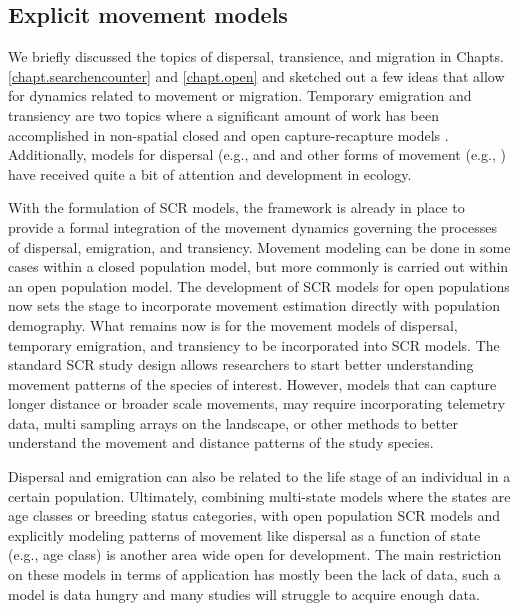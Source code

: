 \subsection{Explicit movement models}



We briefly discussed the topics of dispersal,
transience, and migration in Chapts. \ref{chapt.searchencounter} and \ref{chapt.open} and sketched out
a few ideas that allow for dynamics related to movement or migration.
Temporary emigration and transiency are two topics where
a significant amount of work has been accomplished in non-spatial closed and open capture-recapture
models \citep{kendall_etal:1997, pradel_hines:1997, hines_etal:2003,
clavel_etal:2008, gilroy_etal:2012,chandler_etal:2011}.
Additionally, models for dispersal (e.g., \citet{clobert_etal:2001,
ovaskainen:2004, ovaskainen_etal:2008} and
and other forms of movement (e.g., \cite{jonsen_etal:2005, johnson_etal:2008b,
mcclintock_etal:2012}) have received quite a bit of attention and development in
ecology.

With the formulation of SCR models, the framework is already in place to provide
a formal integration of the movement dynamics governing the processes
of dispersal, emigration, and transiency. Movement modeling can be done
in some cases within a closed
population model, but more commonly is carried out within an open population model.
The development of SCR models for open populations \citep{gardner_etal:2012} now sets
the stage to incorporate
movement estimation directly with population demography. What remains now is for the
movement models
of dispersal, temporary emigration, and transiency to be incorporated into SCR models.
The standard SCR study design allows researchers to start better understanding movement patterns of
the species of interest.  However, models that can capture longer distance or broader scale movements,
may require incorporating telemetry data, multi sampling arrays on the landscape, or other
methods to better understand the movement and distance patterns of the study species.

Dispersal and emigration can also be related to the life stage of an individual in
a certain population.  Ultimately, combining multi-state models where the states are
age classes or breeding status categories, with open population SCR models and explicitly
modeling patterns of movement like dispersal as a function of state (e.g., age class) is
another area wide open for development.  The main restriction on these models in terms
of application has mostly been the lack of data, such a model is data hungry and many studies
will struggle to acquire enough data.



